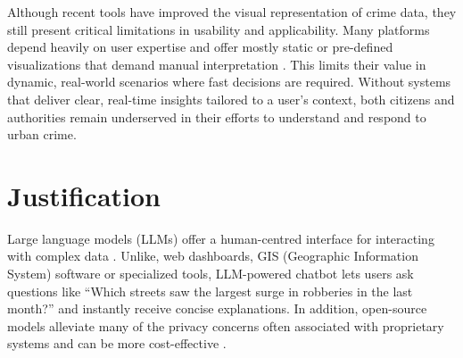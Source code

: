 Although recent tools have improved the visual representation of crime data, they still present critical limitations in usability and applicability. Many platforms depend heavily on user expertise and offer mostly static or pre-defined visualizations that demand manual interpretation \cite{Garcia2022CriPAV}. This limits their value in dynamic, real-world scenarios where fast decisions are required. Without systems that deliver clear, real-time insights tailored to a user's context, both citizens and authorities remain underserved in their efforts to understand and respond to urban crime.




\section{Justification}



Large language models (LLMs) offer a human-centred interface for interacting with complex data \cite{Yang2024HumanAIInteraction, Pappula2023LLMsFC}. Unlike, web dashboards, GIS (Geographic Information System) software or specialized tools, LLM-powered chatbot lets users ask questions like ``Which streets saw the largest surge in robberies in the last month?'' and instantly receive concise explanations. In addition, open-source models alleviate many of the privacy concerns often associated with proprietary systems and can be more cost-effective \cite{Liu2024NLDriven}. 

